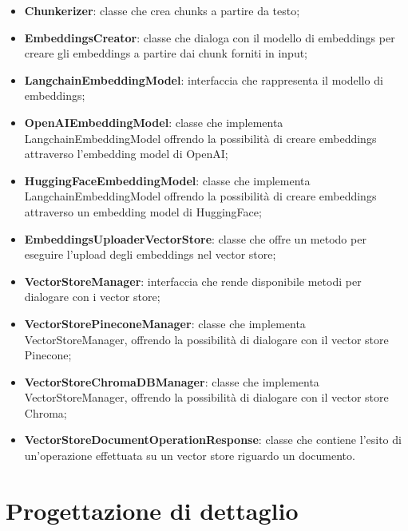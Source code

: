 \documentclass[10pt, a4paper]{article}
\begin{document}
\begin{itemize}
    \item \textbf{Chunkerizer}: classe che crea chunks a partire da testo;
    \item \textbf{EmbeddingsCreator}: classe che dialoga con il modello di embeddings per creare gli embeddings a partire dai chunk forniti in input;
    \item \textbf{LangchainEmbeddingModel}: interfaccia che rappresenta il modello di embeddings;
    \item \textbf{OpenAIEmbeddingModel}: classe che implementa LangchainEmbeddingModel offrendo la possibilità di creare embeddings attraverso l'embedding model di OpenAI;
    \item \textbf{HuggingFaceEmbeddingModel}: classe che implementa LangchainEmbeddingModel offrendo la possibilità di creare embeddings attraverso un embedding model di HuggingFace;
    \item \textbf{EmbeddingsUploaderVectorStore}: classe che offre un metodo per eseguire l'upload degli embeddings nel vector store;
    \item \textbf{VectorStoreManager}: interfaccia che rende disponibile metodi per dialogare con i vector store;
    \item \textbf{VectorStorePineconeManager}: classe che implementa VectorStoreManager, offrendo la possibilità di dialogare con il vector store Pinecone;
    \item \textbf{VectorStoreChromaDBManager}: classe che implementa VectorStoreManager,  offrendo la possibilità di dialogare con il vector store Chroma;
    \item \textbf{VectorStoreDocumentOperationResponse}: classe che contiene l'esito di un'operazione effettuata su un vector store riguardo un documento.
\end{itemize}

\newpage
\section{Progettazione di dettaglio}
\end{document}
